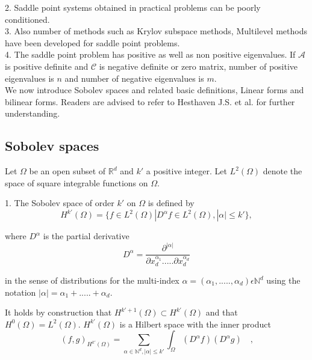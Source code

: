 \documentclass[a4paper,openany]{book}
\begin{document}
\begin{appendices}
2. Saddle point systems obtained in practical problems can be poorly conditioned.\\

3. Also number of methods such as Krylov subspace methods, Multilevel methods have been developed for saddle point problems.\\

4. The saddle point problem has positive as well as non positive eigenvalues. If $\mathcal{A}$ is positive definite and $\mathcal{C}$ is negative definite or zero matrix, number of positive eigenvalues is $n$ and number of negative eigenvalues is $m$. \\

We now introduce Sobolev spaces and related basic definitions, Linear forms and bilinear forms. Readers are advised to refer to Hesthaven J.S. et al.\cite{crbm} for further understanding.

\subsection{Sobolev spaces} 

Let $\Omega$ be an open subset of $\mathbb{R}^d$ and $k'$ a positive integer. Let $L^2(\Omega)$ denote the space of square integrable functions on $\Omega$. 

1. The Sobolev space of order $k'$ on $\Omega$ is defined by\\
\begin{equation}
H^{k'} (\Omega) = \lbrace f \in L^2 (\Omega) | D^\alpha f \in L^2 (\Omega), |\alpha| \leq k' \rbrace ,
\end{equation} 

where $D^\alpha$ is the partial derivative
\begin{equation}
D^\alpha = \frac{\partial^{|\alpha|}}{\partial x_d^{\alpha_1} ..... \partial x_d^{\alpha_d}}
\end{equation}

in the sense of distributions for the multi-index $\alpha = (\alpha_1,.....,\alpha_d) \epsilon \mathbb{N}^d$ using the notation $|\alpha| = \alpha_1 + ..... + \alpha_d $.

It holds by construction that $H^{k'+1}(\Omega) \subset H^{k'} (\Omega)$ and that $H^0 (\Omega) = L^2 (\Omega)$. $H^{k'}(\Omega)$ is a Hilbert space with the inner product
\begin{equation}
(f,g)_{H^{k'}(\Omega)} = \sum_{\alpha \in \mathbb{N}^d, |\alpha| \leq k'} \int_\Omega (D^\alpha f) (D^\alpha g) \quad \textrm{,}
\end{equation}


\end{appendices}
\end{document}
